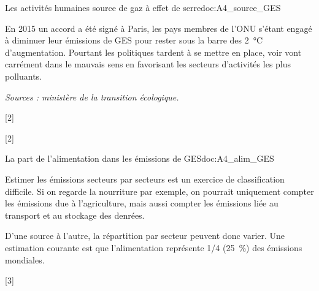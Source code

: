 \begin{doc}{Les activités humaines source de gaz à effet de serre}{doc:A4_source_GES}
  
  En 2015 un accord a été signé à Paris, les pays membres de l'ONU s'étant engagé à diminuer leur émissions de GES pour rester sous la barre des \qty{2}{\degreeCelsius} d'augmentation.
  Pourtant les politiques tardent à se mettre en place, voir vont carrément dans le mauvais sens en favorisant les secteurs d'activités les plus polluants.

  \begin{center}


    
    \textit{Sources : ministère de la transition écologique.}
  \end{center}
\end{doc}

[2]

[2]


\begin{doc}{La part de l'alimentation dans les émissions de GES}{doc:A4_alim_GES}
  
  Estimer les émissions secteurs par secteurs est un exercice de classification difficile.
  Si on regarde la nourriture par exemple, on pourrait uniquement compter les émissions due à l'agriculture,
  mais aussi compter les émissions liée au transport et au stockage des denrées.

  D'une source à l'autre, la répartition par secteur peuvent donc varier.
  Une estimation courante est que l'alimentation représente 1/4 (\qty{25}{\percent}) des émissions mondiales.
\end{doc}

[3]
